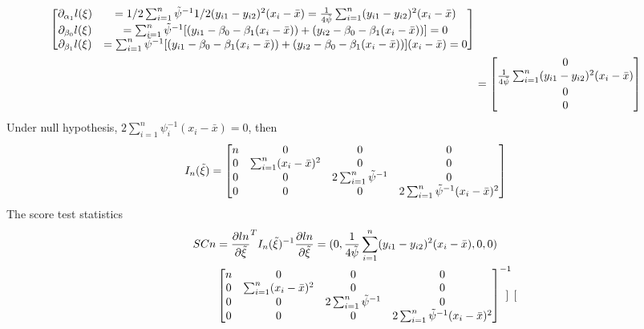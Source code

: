 \documentclass[11pt]{article} %
\begin{document}
\begin{itemize}
\begin{align*}
\begin{bmatrix}
			\partial_{\alpha_1} l(\xi) &= 1/2  \sum_{i=1}^n \Tilde{\psi}^{-1} 1/2 (y_{i1}-y_{i2})^2 (x_i-\bar{x}) = \frac{1}{4 \Tilde{\psi}} \sum_{i=1}^n(y_{i1}-y_{i2})^2 (x_i-\bar{x})  \\
			\partial_{\beta_0} l(\xi) &=\sum_{i=1}^n \Tilde{\psi}^{-1} [(y_{i1}-\beta_0-\beta_1(x_i-\bar{x})) + (y_{i2}-\beta_0-\beta_1(x_i-\bar{x}))] =0  \\
			\partial_{\beta_1} l(\xi)& =\sum_{i=1}^n \Tilde{\psi}^{-1} [(y_{i1}-\beta_0-\beta_1(x_i-\bar{x})) + (y_{i2}-\beta_0-\beta_1(x_i-\bar{x}))] (x_i-\bar{x})=0 \\
		\end{bmatrix} \\
		&= \begin{bmatrix}
			0\\
			\frac{1}{4 \Tilde{\psi}} \sum_{i=1}^n(y_{i1}-y_{i2})^2 (x_i-\bar{x})   \\
			0 \\
			0 \\
		\end{bmatrix}
	\end{align*} 
	Under null hypothesis, $2 \sum_{i=1}^n \psi_i^{-1} (x_i-\bar{x}) = 0$, then 
	\begin{align*}
		I_n(\Tilde{\xi}) &= \begin{bmatrix}
			n & 0&  0 &  0\\
			0 & \sum_{i=1}^n (x_i-\bar{x})^2 & 0  & 0 \\
			0 & 0&  2\sum_{i=1}^n \Tilde{\psi}^{-1}  & 0\\
			0 &  0& 0  & 2\sum_{i=1}^n \Tilde{\psi}^{-1}(x_i-\bar{x})^2  \\
		\end{bmatrix}
	\end{align*}
	The score test statistics
	\begin{align*}
		SCn &= \frac{\partial ln}{\partial \Tilde{\xi}}^T I_n(\Tilde{\xi})^{-1} \frac{\partial ln}{\partial \Tilde{\xi}}  = (0,\frac{1}{4 \Tilde{\psi}} \sum_{i=1}^n(y_{i1}-y_{i2})^2 (x_i-\bar{x}), 0, 0 )\\
		& \begin{bmatrix}
			n & 0&  0 &  0\\
			0 & \sum_{i=1}^n (x_i-\bar{x})^2 & 0  & 0 \\
			0 & 0&  2\sum_{i=1}^n \Tilde{\psi}^{-1}  & 0\\
			0 &  0& 0  & 2\sum_{i=1}^n \Tilde{\psi}^{-1}(x_i-\bar{x})^2  \\
		\end{bmatrix}^{-1} \begin{bmatrix}

\end{bmatrix}
\end{align*}
\end{itemize}
\end{document}
